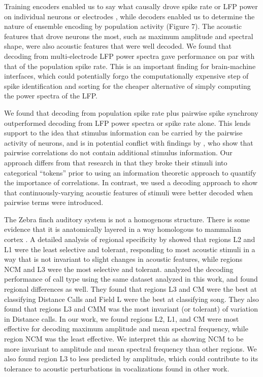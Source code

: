    Training encoders enabled us to say what causally drove spike rate or LFP power on individual neurons or electrodes \cite{Weichwald2015}, while decoders enabled us to determine the nature of ensemble encoding by population activity (Figure 7). The acoustic features that drove neurons the most, such as maximum amplitude and spectral shape, were also acoustic features that were well decoded. We found that decoding from multi-electrode LFP power spectra gave performance on par with that of the population spike rate. This is an important finding for brain-machine interfaces, which could potentially forgo the computationally expensive step of spike identification and sorting for the cheaper alternative of simply computing the power spectra of the LFP.

    We found that decoding from population spike rate plus pairwise spike synchrony outperformed decoding from LFP power spectra or spike rate alone. This lends support to the idea that stimulus information can be carried by the pairwise activity of neurons, and is in potential conflict with findings by \cite{Ince2013}, who show that pairwise correlations do not contain additional stimulus information. Our approach differs from that research in that they broke their stimuli into categorical “tokens” prior to using an information theoretic approach to quantify the importance of correlations. In contrast, we used a decoding approach to show that continuously-varying acoustic features of stimuli were better decoded when pairwise terms were introduced.

The Zebra finch auditory system is not a homogenous structure. There is some evidence that it is anatomically layered in a way homologous to mammalian cortex \cite{Wang2010}. A detailed analysis of regional specificity by \cite{Meliza2012} showed that regions L2 and L1 were the least selective and tolerant, responding to most acoustic stimuli in a way that is not invariant to slight changes in acoustic features, while regions NCM and L3 were the most selective and tolerant. \cite{Elie2015a} analyzed the decoding performance of call type using the same dataset analyzed in this work, and found regional differences as well. They found that regions L3 and CM were the best at classifying Distance Calls and Field L were the best at classifying song. They also found that regions L3 and CMM was the most invariant (or tolerant) of variation in Distance calls. In our work, we found regions L2, L1, and CM were most effective for decoding maximum amplitude and mean spectral frequency, while region NCM was the least effective. We interpret this as showing NCM to be more invariant to amplitude and mean spectral frequency than other regions. We also found region L3 to less predicted by amplitude, which could contribute to its tolerance to acoustic perturbations in vocalizations found in other work.

